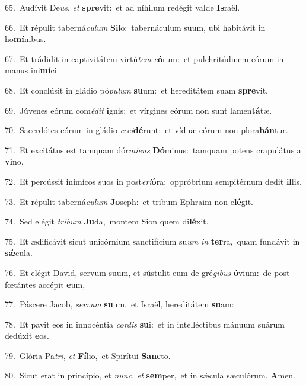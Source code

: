 {\numbfont\textcolor{\numbcolor}{65.}}~Audívit De\-\textit{us}\-, \textit{et} \textbf{spre}\-vit:~\star et ad níhilum redégit valde \textbf{Is}\-raël.\par
{\numbfont\textcolor{\numbcolor}{66.}}~Et répulit taberná\-\textit{cu}\-\textit{lum} \textbf{Si}\-lo:~\star tabernáculum suum, ubi habitávit in ho\-\textbf{mí}\-nibus.\par
{\numbfont\textcolor{\numbcolor}{67.}}~Et trádidit in captivitátem virtú\textit{tem} \textit{e}\-\textbf{ó}rum:~\star et pulchritúdinem eórum in manus ini\-\textbf{mí}\-ci.\par
{\numbfont\textcolor{\numbcolor}{68.}}~Et conclúsit in gládio pó\-\textit{pu}\-\textit{lum} \textbf{su}\-um:~\star et hereditátem suam \textbf{spre}\-vit.\par
{\numbfont\textcolor{\numbcolor}{69.}}~Júvenes eórum com\-\textit{é}\-\textit{dit} \textbf{i}\-gnis:~\star et vírgines eórum non sunt lamen\-\textbf{tá}\-tæ.\par
{\numbfont\textcolor{\numbcolor}{70.}}~Sacerdótes eórum in gládio \textit{ce}\-\textit{ci}\textbf{dé}runt:~\star et víduæ eórum non plora\-\textbf{bán}\-tur.\par
{\numbfont\textcolor{\numbcolor}{71.}}~Et excitátus est tamquam dór\-\textit{mi}\-\textit{ens} \textbf{Dó}\-minus:~\star tamquam potens crapulátus a \textbf{vi}\-no.\par
{\numbfont\textcolor{\numbcolor}{72.}}~Et percússit inimícos suos in post\-\textit{e}\-\textit{ri}\textbf{ó}ra:~\star oppróbrium sempitérnum dedit \textbf{il}\-lis.\par
{\numbfont\textcolor{\numbcolor}{73.}}~Et répulit taberná\-\textit{cu}\-\textit{lum} \textbf{Jo}\-seph:~\star et tribum Ephraim non e\-\textbf{lé}\-git.\par
{\numbfont\textcolor{\numbcolor}{74.}}~Sed elégit \textit{tri}\-\textit{bum} \textbf{Ju}\-da,~\star montem Sion quem di\-\textbf{lé}\-xit.\par
{\numbfont\textcolor{\numbcolor}{75.}}~Et ædificávit sicut unicórnium sanctifícium su\textit{um} \textit{in} \textbf{ter}\-ra,~\star quam fundávit in \textbf{sǽ}\-cula.\par
{\numbfont\textcolor{\numbcolor}{76.}}~Et elégit David, servum suum, et sústulit eum de gré\-\textit{gi}\-\textit{bus} \textbf{ó}\-vium:~\star de post fœtántes accépit \textbf{e}\-um,\par
{\numbfont\textcolor{\numbcolor}{77.}}~Páscere Jacob, \textit{ser}\-\textit{vum} \textbf{su}\-um,~\star et Israël, hereditátem \textbf{su}\-am:\par
{\numbfont\textcolor{\numbcolor}{78.}}~Et pavit eos in innocéntia \textit{cor}\-\textit{dis} \textbf{su}\-i:~\star et in intelléctibus mánuum suárum dedúxit \textbf{e}\-os.\par
{\numbfont\textcolor{\numbcolor}{79.}}~Glória Pa\-\textit{tri}\-, \textit{et} \textbf{Fí}\-lio,~\star et Spirítui \textbf{Sanc}\-to.\par
{\numbfont\textcolor{\numbcolor}{80.}}~Sicut erat in princípio, et \textit{nunc}\-, \textit{et} \textbf{sem}\-per,~\star et in sǽcula sæculórum. \textbf{A}\-men.\par
